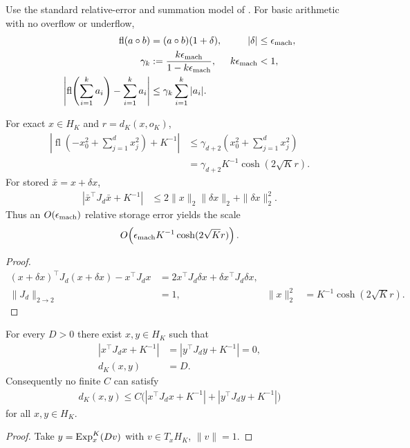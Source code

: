 \begin{assumption}
Use the standard relative-error and summation model of \citet{higham2002accuracy}. For basic arithmetic with no overflow or underflow,
\begin{align}
 \operatorname{fl}(a\circ b)&=(a\circ b)(1+\delta),&|\delta|&\le\epsilon_{\rm mach},\\
 \gamma_k&:=\frac{k\epsilon_{\rm mach}}{1-k\epsilon_{\rm mach}},&k\epsilon_{\rm mach}&<1,\\
 \left|\operatorname{fl}\!\left(\sum_{i=1}^ka_i\right)-\sum_{i=1}^ka_i\right|
 &\le\gamma_k\sum_{i=1}^k|a_i|.
\end{align}
\end{assumption}
\begin{proposition}
For exact $x\in H_K$ and $r=d_K(x,o_K)$,
\begin{align}
 \left|\operatorname{fl}\!\left(-x_0^2+\sum_{j=1}^dx_j^2\right)+K^{-1}\right|
 &\le\gamma_{d+2}\left(x_0^2+\sum_{j=1}^dx_j^2\right)\\
 &=\gamma_{d+2}K^{-1}\cosh(2\sqrt Kr).
\end{align}
For stored $\bar x=x+\delta x$,
\begin{align}
 |\bar x^\top J_d\bar x+K^{-1}|
 &\le2\|x\|_2\|\delta x\|_2+\|\delta x\|_2^2.
\end{align}
Thus an $O(\epsilon_{\rm mach})$ relative storage error yields the scale
\begin{align}
 O\!\left(\epsilon_{\rm mach}K^{-1}\cosh(2\sqrt Kr)\right).
\end{align}
\end{proposition}
\begin{proof}
\begin{align}
 (x+\delta x)^\top J_d(x+\delta x)-x^\top J_dx
 &=2x^\top J_d\delta x+\delta x^\top J_d\delta x,\\
 \|J_d\|_{2\to2}&=1,&
 \|x\|_2^2&=K^{-1}\cosh(2\sqrt Kr).
\end{align}
\end{proof}

\begin{proposition}
For every $D>0$ there exist $x,y\in H_K$ such that
\begin{align}
 |x^\top J_dx+K^{-1}|&=|y^\top J_dy+K^{-1}|=0,\\
 d_K(x,y)&=D.
\end{align}
Consequently no finite $C$ can satisfy
\begin{align}
 d_K(x,y)\le C\bigl(|x^\top J_dx+K^{-1}|+|y^\top J_dy+K^{-1}|\bigr)
\end{align}
for all $x,y\in H_K$.
\end{proposition}
\begin{proof}
Take $y=\operatorname{Exp}_x^K(Dv)$ with $v\in T_xH_K$, $\|v\|=1$.
\end{proof}
